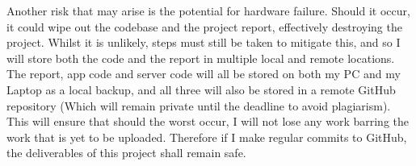 Another risk that may arise is the potential for hardware failure. 
Should it occur, it could wipe out the codebase and the project report, effectively destroying the project. 
Whilst it is unlikely, steps must still be taken to mitigate this, and so I will store both the code and the report in multiple local and remote locations.
The report, app code and server code will all be stored on both my PC and my Laptop as a local backup, and all three will also be stored in a remote GitHub repository (Which will remain private until the deadline to avoid plagiarism).
This will ensure that should the worst occur, I will not lose any work barring the work that is yet to be uploaded.
Therefore if I make regular commits to GitHub, the deliverables of this project shall remain safe. 
